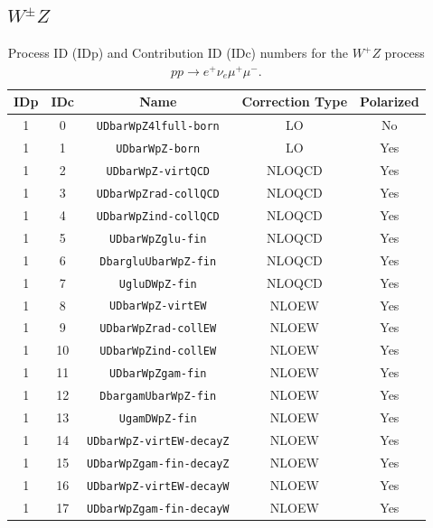 \documentclass[english,12pt]{article}
\begin{document}
\subsection{$W^\pm Z$}
\begin{table}[th!]
\begin{center}
\begin{tabular}{|c|c|c|c|c|}\hline
IDp & IDc & Name & Correction Type & Polarized \\
\hline
1 & 0 & {\tt UDbarWpZ4lfull-born} & LO & No\\
1 & 1 & {\tt UDbarWpZ-born} & LO & Yes\\
1 & 2 & {\tt UDbarWpZ-virtQCD} & NLOQCD & Yes\\
1 & 3 & {\tt UDbarWpZrad-collQCD} & NLOQCD & Yes\\
1 & 4 & {\tt UDbarWpZind-collQCD} & NLOQCD & Yes\\
1 & 5 & {\tt UDbarWpZglu-fin} & NLOQCD & Yes\\
1 & 6 & {\tt DbargluUbarWpZ-fin} & NLOQCD & Yes\\
1 & 7 & {\tt UgluDWpZ-fin} & NLOQCD & Yes\\
1 & 8 & {\tt UDbarWpZ-virtEW} & NLOEW & Yes\\
1 & 9 & {\tt UDbarWpZrad-collEW} & NLOEW & Yes\\
1 & 10 & {\tt UDbarWpZind-collEW} & NLOEW & Yes\\
1 & 11 & {\tt UDbarWpZgam-fin} & NLOEW & Yes\\
1 & 12 & {\tt DbargamUbarWpZ-fin} & NLOEW & Yes\\
1 & 13 & {\tt UgamDWpZ-fin} & NLOEW & Yes\\
1 & 14 & {\tt UDbarWpZ-virtEW-decayZ} & NLOEW & Yes\\
1 & 15 & {\tt UDbarWpZgam-fin-decayZ} & NLOEW & Yes\\
1 & 16 & {\tt UDbarWpZ-virtEW-decayW} & NLOEW & Yes\\
1 & 17 & {\tt UDbarWpZgam-fin-decayW} & NLOEW & Yes\\
\hline
\end{tabular}
\caption{\small Process ID (IDp) and Contribution ID (IDc) numbers for the $W^+Z$ process $pp \to e^+\nu_e\mu^+\mu^-$.}
\label{tab:IDs_proc_cont_WpZ}
\end{center}
\end{table}
\end{document}
